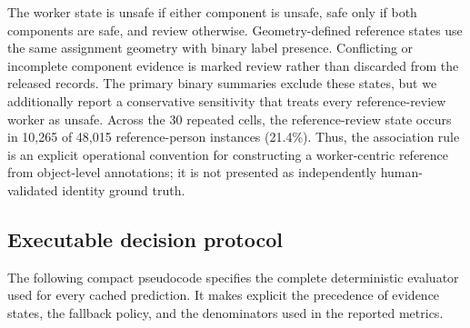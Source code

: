 \documentclass[iicol,pdflatex,sn-mathphys-num]{sn-jnl}
\begin{document}
The worker state is unsafe if either component is unsafe, safe only if both components are safe, and review otherwise. Geometry-defined reference states use the same assignment geometry with binary label presence. Conflicting or incomplete component evidence is marked review rather than discarded from the released records. The primary binary summaries exclude these states, but we additionally report a conservative sensitivity that treats every reference-review worker as unsafe. Across the 30 repeated cells, the reference-review state occurs in 10,265 of 48,015 reference-person instances (21.4\%). Thus, the association rule is an explicit operational convention for constructing a worker-centric reference from object-level annotations; it is not presented as independently human-validated identity ground truth.

\subsection{Executable decision protocol}
The following compact pseudocode specifies the complete deterministic evaluator used for every cached prediction. It makes explicit the precedence of evidence states, the fallback policy, and the denominators used in the reported metrics.
\end{document}

